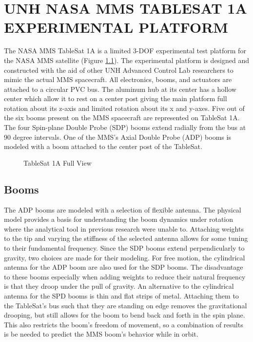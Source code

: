 
\chapter{UNH NASA MMS TABLESAT 1A EXPERIMENTAL PLATFORM}
\label{chap:UNHTableSat1A}

The NASA MMS TableSat 1A is a limited 3-DOF experimental test platform for the NASA MMS satellite (Figure \ref{fig:TSatFullView}).  The experimental platform is designed and constructed with the aid of other UNH Advanced Control Lab researchers to mimic the actual MMS spacecraft.  All electronics, booms, and actuators are attached to a circular PVC bus.  The aluminum hub at its center has a hollow center which allow it to rest on a center post giving the main platform full rotation about its z-axis and limited rotation about its x and y-axes.  Five out of the six booms present on the MMS spacecraft are represented on TableSat 1A.  The four Spin-plane Double Probe (SDP) booms extend radially from the bus at 90 degree intervals.  One of the MMS's Axial Double Probe (ADP) booms is modeled with a boom attached to the center post of the TableSat.

\begin{figure}[h]
  \centerline{}
  \caption{TableSat 1A Full View}
  \label{fig:TSatFullView}
\end{figure}

\section{Booms}
\label{sec:Booms}

The ADP booms are modeled with a selection of flexible antenna.  The physical model provides a basis for understanding the boom dynamics under rotation where the analytical tool in previous research \cite{mushaweh} were unable to.  Attaching weights to the tip and varying the stiffness of the selected antenna allows for some tuning to their fundamental frequency.  Since the SDP booms extend perpendicularly to gravity, two choices are made for their modeling.  For free motion, the cylindrical antenna for the ADP boom are also used for the SDP booms.  The disadvantage to these booms especially when adding weights to reduce their natural frequency is that they droop under the pull of gravity.  An alternative to the cylindrical antenna for the SPD booms is thin and flat strips of metal.  Attaching them to the TableSat's bus such that they are standing on edge removes the gravitational drooping, but still allows for the boom to bend back and forth in the spin plane.  This also restricts the boom's freedom of movement, so a combination of results is be needed to predict the MMS boom's behavior while in orbit.

